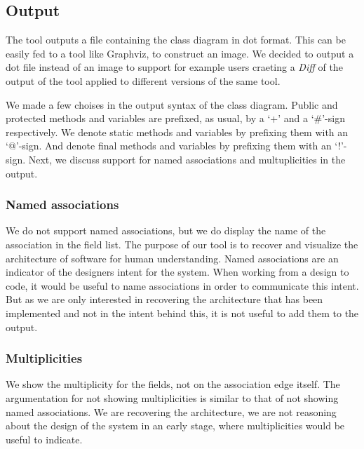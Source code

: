 \subsection{Output}
	The tool outputs a file containing the class diagram in dot format. 
	This can be easily fed to a tool like Graphviz, to construct an image.
	We decided to output a dot file instead of an image to support for example users craeting a \textit{Diff} of the output of the tool 	applied to different versions of the same tool.
	
	We made a few choises in the output syntax of the class diagram. 
	Public and protected methods and variables are prefixed, as usual, by a `+' and a `\#'-sign respectively.
	We denote static methods and variables by prefixing them with an `@'-sign.
	And denote final methods and variables by prefixing them with an `!'-sign.	
	Next, we discuss support for named associations and multuplicities in the output.

	\subsubsection{Named associations}
		We do not support named associations, but we do display the name of the association in the field list. 
		The purpose of our tool is to recover and visualize the architecture of software for human understanding.
		Named associations are an indicator of the designers intent for the system.
		When working from a design to code, it would be useful to name associations in order to communicate this intent.
		But as we are only interested in recovering the architecture that has been implemented and not in the intent behind this,
		it is not useful to add them to the output.
		
	\subsubsection{Multiplicities}
		We show the multiplicity for the fields, not on the association edge itself. 
		The argumentation for not showing multiplicities is similar to that of not showing named associations.
		We are recovering the architecture, we are not reasoning about the design of the system in an early stage, 
		where multiplicities would be useful to indicate.
